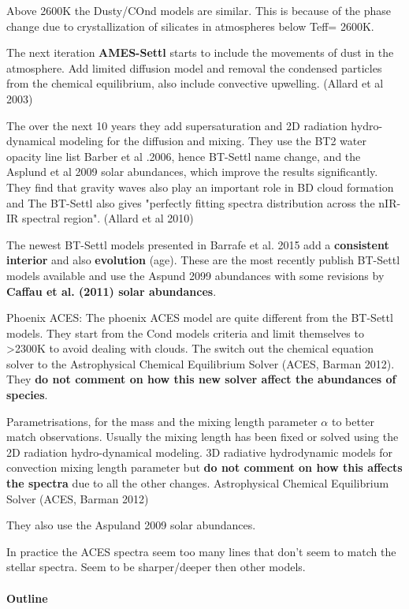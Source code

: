 \documentclass[12pt, a4paper]{article}
\begin{document}
Above 2600K the Dusty/COnd models are similar. This is because of the phase change due to crystallization of silicates in atmospheres below Teff= 2600K.

The next iteration \textbf{AMES-Settl} starts to include the movements of dust in the atmosphere. Add limited diffusion model and removal the condensed particles from the chemical equilibrium, also include convective upwelling. (Allard et al 2003)

The over the next 10 years they add supersaturation and 2D radiation hydro-dynamical modeling for the diffusion and mixing. 
They use the BT2 water opacity line list Barber et al .2006, hence BT-Settl name change, and the Asplund et al 2009 solar abundances, which improve the results significantly.
They find that gravity waves also play an important role in BD cloud formation and The BT-Settl also gives "perfectly fitting spectra distribution across the nIR- IR spectral region". (Allard et al 2010)  


The newest BT-Settl models presented in Barrafe et al. 2015  add a \textbf{consistent interior} and also \textbf{evolution} (age). These are the most recently publish BT-Settl models available and use the Aspund 2099 abundances with some revisions by \textbf{ Caffau et al. (2011) solar abundances}.


Phoenix ACES:
The phoenix ACES model are quite different from the BT-Settl models. They start from the Cond models criteria and limit themselves to >2300K to avoid dealing with clouds. The switch out the chemical equation solver to the Astrophysical   Chemical   Equilibrium   Solver   (ACES, Barman 2012). They \textbf{do not comment on how this new solver affect the abundances of species}.


Parametrisations, for the mass and the mixing length parameter \(\alpha\) to better match observations. Usually the mixing length has been fixed or solved using the 2D radiation hydro-dynamical modeling.
3D radiative hydrodynamic models for convection mixing length parameter but \textbf{do not comment on how this affects the spectra} due to all the other changes.  
Astrophysical   Chemical   Equilibrium   Solver   (ACES,
Barman 2012) 

They also use the Aspuland 2009 solar abundances.


In practice the ACES spectra seem too many lines that don't seem to match the stellar spectra.   Seem to be sharper/deeper then other models.


\paragraph{Outline}
\end{document}
